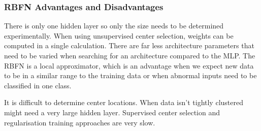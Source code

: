 \documentclass[a4paper, 11pt]{article}
\begin{document}
\subsubsection{RBFN Advantages and Disadvantages}
There is only one hidden layer so only the size needs to be determined experimentally. When using unsupervised center selection, weights can be computed in a single calculation. There are far less architecture parameters that need to be varied when searching for an  architecture compared to the MLP. The RBFN is a local approximator, which is an advantage when we expect new data to be in a similar range to the training data or when abnormal inputs need to be classified in one class. 

It is difficult to determine center locations. When data isn't tightly clustered might need a very large hidden layer.  Supervised center selection and regularisation training approaches are very slow. 

\end{document}
